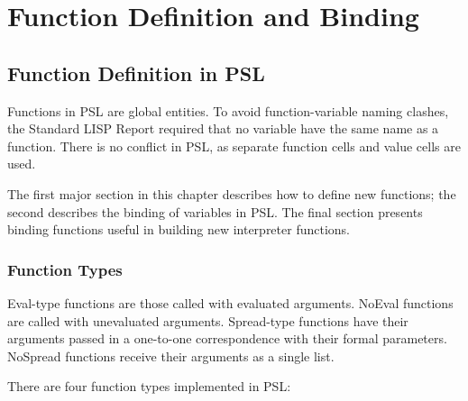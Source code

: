\chapter{Function Definition and Binding}

\section{Function Definition in PSL}

Functions in PSL are global entities.  To  avoid
function-variable  naming  clashes,  the  Standard  LISP  Report
required  that  no  variable  have  the same name as a function.
There is no conflict in PSL, as separate function cells and
value cells are used.

  The  first  major  section  in  this  chapter describes how to
define new  functions;  the  second  describes  the  binding  of
variables  in PSL.  The final section presents binding functions
useful in building new interpreter functions.

\subsection{Function Types}

  Eval-type functions are those called with evaluated arguments.
NoEval  functions  are  called   with   unevaluated   arguments.
Spread-type   functions   have   their  arguments  passed  in  a
one-to-one  correspondence   with   their   formal   parameters.
NoSpread functions receive their arguments as a single list.

There are four function types implemented in PSL:\\

